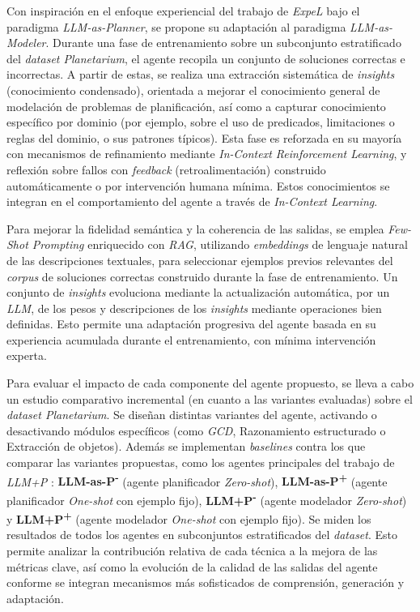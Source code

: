 Con inspiración en el enfoque experiencial del trabajo de \textit{ExpeL} bajo el paradigma \textit{LLM-as-Planner}, se propone su adaptación al paradigma \textit{LLM-as-Modeler}. Durante una fase de entrenamiento sobre un subconjunto estratificado del \textit{dataset Planetarium}, el agente recopila un conjunto de soluciones correctas e incorrectas. A partir de estas, se realiza una extracción sistemática de \textit{insights} (conocimiento condensado), orientada a mejorar el conocimiento general de modelación de problemas de planificación, así como a capturar conocimiento específico por dominio (por ejemplo, sobre el uso de predicados, limitaciones o reglas del dominio, o sus patrones típicos). Esta fase es reforzada en su mayoría con mecanismos de refinamiento mediante \textit{In-Context Reinforcement Learning}, y reflexión sobre fallos con \textit{feedback} (retroalimentación) construido automáticamente o por intervención humana mínima. Estos conocimientos se integran en el comportamiento del agente a través de \textit{In-Context Learning}.

Para mejorar la fidelidad semántica y la coherencia de las salidas, se emplea \textit{Few-Shot Prompting} enriquecido con \textit{RAG}, utilizando \textit{embeddings} de lenguaje natural de las descripciones textuales, para seleccionar ejemplos previos relevantes del \textit{corpus} de soluciones correctas construido durante la fase de entrenamiento. Un conjunto de \textit{insights} evoluciona mediante la actualización automática, por un \textit{LLM}, de los pesos y descripciones de los \textit{insights} mediante operaciones bien definidas. Esto permite una adaptación progresiva del agente basada en su experiencia acumulada durante el entrenamiento, con mínima intervención experta.

Para evaluar el impacto de cada componente del agente propuesto, se lleva a cabo un estudio comparativo incremental (en cuanto a las variantes evaluadas) sobre el \textit{dataset Planetarium}. Se diseñan distintas variantes del agente, activando o desactivando módulos específicos (como \textit{GCD}, Razonamiento estructurado o Extracción de objetos). Además se implementan \textit{baselines} contra los que comparar las variantes propuestas, como los agentes principales del trabajo de \textit{LLM+P} \parencite{liu2023llm+}: \textbf{LLM-as-P\textsuperscript{-}} (agente planificador \textit{Zero-shot}), \textbf{LLM-as-P\textsuperscript{+}} (agente planificador \textit{One-shot} con ejemplo fijo), \textbf{LLM+P\textsuperscript{-}} (agente modelador \textit{Zero-shot}) y \textbf{LLM+P\textsuperscript{+}} (agente modelador \textit{One-shot} con ejemplo fijo). Se miden los resultados de todos los agentes en subconjuntos estratificados del \textit{dataset}. Esto permite analizar la contribución relativa de cada técnica a la mejora de las métricas clave, así como la evolución de la calidad de las salidas del agente conforme se integran mecanismos más sofisticados de comprensión, generación y adaptación.


